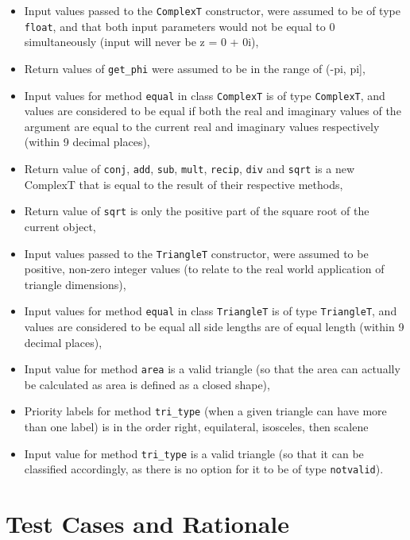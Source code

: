 \documentclass[12pt]{article}
\begin{document}
\begin{itemize}
        \item Input values passed to the \verb|ComplexT| constructor, were 
        assumed to be of type \verb|float|, and that both input parameters 
        would not be equal to 0 simultaneously (input will never be z = 0 + 0i),
        \item Return values of \verb|get_phi| were assumed to be in the range 
        of (-pi, pi],
        \item Input values for method \verb|equal| in class \verb|ComplexT| is 
        of type \verb|ComplexT|, and values are considered to be equal if both 
        the real and imaginary values of the argument are equal to the current 
        real and imaginary values respectively (within 9 decimal places),
        \item Return value of \verb|conj|, \verb|add|, \verb|sub|, \verb|mult|, 
        \verb|recip|, \verb|div| and \verb|sqrt| is a new ComplexT that is 
        equal to the result of their respective methods,
        \item Return value of \verb|sqrt| is only the positive part of the square 
        root of the current object, 
        \item Input values passed to the \verb|TriangleT| constructor, were 
        assumed to be positive, non-zero integer values (to relate to the real 
        world application of triangle dimensions),
        \item Input values for method \verb|equal| in class \verb|TriangleT| is 
        of type \verb|TriangleT|, and values are considered to be equal all side 
        lengths are of equal length (within 9 decimal places),
        \item Input value for method \verb|area| is a valid triangle (so that the 
        area can actually be calculated as area is defined as a closed shape), 
        \item Priority labels for method \verb|tri_type| (when a given triangle 
        can have more than one label) is in the order right, equilateral, 
        isosceles, then scalene
        \item Input value for method \verb|tri_type| is a valid triangle (so 
        that it can be classified accordingly, as there is no option for it 
        to be of type \verb|notvalid|).
\end{itemize}

\section{Test Cases and Rationale} \label{Testing}
\end{document}
